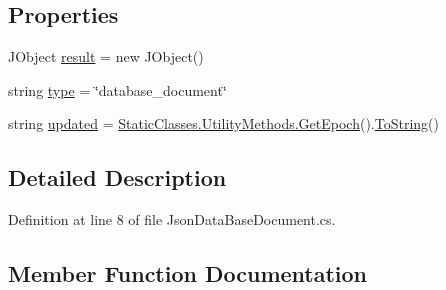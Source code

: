 \subsection*{Properties}
\begin{DoxyCompactItemize}
\item 
J\+Object \mbox{\hyperlink{class_little_weeb_library_1_1_models_1_1_json_data_base_document_afa1d795f001099e7b20b68598a64aa6e}{result}} = new J\+Object()
\item 
string \mbox{\hyperlink{class_little_weeb_library_1_1_models_1_1_json_data_base_document_a5d2a9fcc303c5b63fb119d8d1fac84de}{type}} = \char`\"{}database\+\_\+document\char`\"{}
\item 
string \mbox{\hyperlink{class_little_weeb_library_1_1_models_1_1_json_data_base_document_a42925c25aecabb526e6dbb3172d94efb}{updated}} = \mbox{\hyperlink{class_little_weeb_library_1_1_static_classes_1_1_utility_methods_a12336d9e64983ddabaad8950486fafb2}{Static\+Classes.\+Utility\+Methods.\+Get\+Epoch}}().\mbox{\hyperlink{class_little_weeb_library_1_1_models_1_1_json_data_base_document_a0a84a997c39ac76d99382cdabf9227bf}{To\+String}}()
\end{DoxyCompactItemize}


\subsection{Detailed Description}


Definition at line 8 of file Json\+Data\+Base\+Document.\+cs.



\subsection{Member Function Documentation}
\mbox{\label{class_little_weeb_library_1_1_models_1_1_json_data_base_document_a9b07f0f62d6352441b62b26dff058acb}} 
